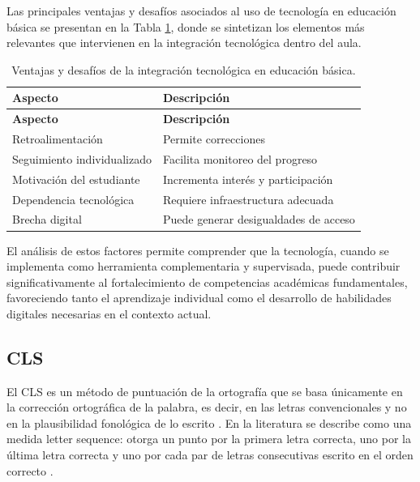 Las principales ventajas y desafíos asociados al uso de tecnología en educación básica se presentan en la Tabla \ref{tab:ventajas}, donde se sintetizan los elementos más relevantes que intervienen en la integración tecnológica dentro del aula.

\begin{longtable}{|p{6cm}|p{7cm}|}
\caption{Ventajas y desafíos de la integración tecnológica en educación básica.}
\label{tab:ventajas} \\

\hline
\textbf{Aspecto} & \textbf{Descripción} \\
\hline
\endfirsthead

\hline
\textbf{Aspecto} & \textbf{Descripción} \\
\hline
\endhead

\hline
\endfoot

Retroalimentación & Permite correcciones \\
\hline

Seguimiento individualizado & Facilita monitoreo del progreso \\
\hline

Motivación del estudiante & Incrementa interés y participación \\
\hline

Dependencia tecnológica & Requiere infraestructura adecuada \\
\hline

Brecha digital & Puede generar desigualdades de acceso \\
\hline

\end{longtable}

El análisis de estos factores permite comprender que la tecnología, cuando se implementa como herramienta complementaria y supervisada, puede contribuir significativamente al fortalecimiento de competencias académicas fundamentales, favoreciendo tanto el aprendizaje individual como el desarrollo de habilidades digitales necesarias en el contexto actual.

\subsection{CLS}
\label{sec:cls}

El CLS es un método de puntuación de la ortografía que se basa únicamente en la corrección ortográfica de la palabra, es decir, en
las letras convencionales y no en la plausibilidad fonológica de lo escrito \cite{treiman2016measures}. En la literatura se describe como una medida letter sequence: otorga un punto por la primera letra correcta, uno por
la última letra correcta y uno por cada par de letras consecutivas escrito en el orden correcto \cite{treiman2016measures}.

